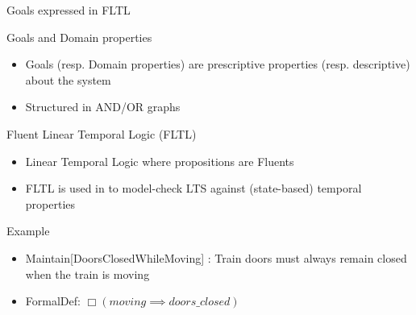 \documentclass[11pt]{beamer}
\begin{document}
\begin{frame}{Goals expressed in FLTL}
	\begin{block}{Goals and Domain properties}
		\begin{itemize}
			\item Goals (resp. Domain properties) are prescriptive properties (resp. descriptive) about the system \cite{AVL09}
			\item Structured in AND/OR graphs
		\end{itemize}
	\end{block}
	\begin{block}{Fluent Linear Temporal Logic (FLTL)}
		\begin{itemize}
			\item Linear Temporal Logic \cite{Manna92} where propositions are Fluents
			\item FLTL is used in \cite{Gianna03} to model-check LTS against (state-based) temporal properties
		\end{itemize}
	\end{block}
	\begin{block}{Example}
		\begin{itemize}
			\item Maintain[DoorsClosedWhileMoving] : Train doors must always remain closed when the train is moving
			\item FormalDef: $\Box(moving \implies doors\_closed) $
		\end{itemize}
	\end{block}
\end{frame}
\end{document}
